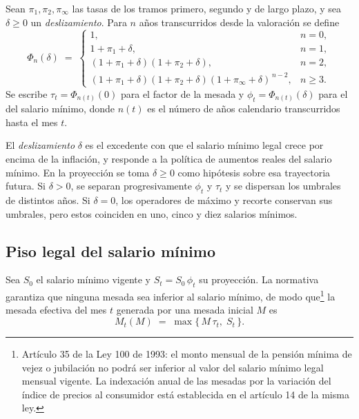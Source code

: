 \begin{definition}
\label{def:factor-indexacion}
Sean $\pi_1,\pi_2,\pi_\infty$ las tasas de los tramos primero, segundo y de largo
plazo, y sea $\delta\ge0$ un \emph{deslizamiento}. Para $n$ años transcurridos
desde la valoración se define
\begin{equation}
\label{eq:factor-ipc}
  \Phi_n(\delta)\;=\;
  \begin{cases}
    1, & n=0,\\[2pt]
    1+\pi_1+\delta, & n=1,\\[2pt]
    (1+\pi_1+\delta)(1+\pi_2+\delta), & n=2,\\[2pt]
    (1+\pi_1+\delta)(1+\pi_2+\delta)(1+\pi_\infty+\delta)^{\,n-2}, & n\ge3.
  \end{cases}
\end{equation}
Se escribe $\tau_t=\Phi_{n(t)}(0)$ para el factor de la mesada y
$\phi_t=\Phi_{n(t)}(\delta)$ para el del salario mínimo, donde $n(t)$ es el número
de años calendario transcurridos hasta el mes $t$.
\end{definition}

El \emph{deslizamiento} $\delta$ es el excedente con que el salario mínimo legal
crece por encima de la inflación, y responde a la política de aumentos reales del
salario mínimo. En la proyección se toma $\delta\ge0$ como hipótesis sobre esa
trayectoria futura. Si $\delta>0$, se separan progresivamente $\phi_t$ y
$\tau_t$ y se dispersan los umbrales de distintos años. Si $\delta=0$,
los operadores de máximo y recorte conservan sus umbrales, pero estos
coinciden en uno, cinco y diez salarios mínimos.

\subsection{Piso legal del salario mínimo}

Sea $S_0$ el salario mínimo vigente y $S_t=S_0\,\phi_t$ su proyección. La
normativa garantiza que ninguna mesada sea inferior al salario mínimo, de modo que\footnote{Artículo 35 de la Ley 100 de 1993: el monto mensual de la pensión mínima de vejez o jubilación no podrá ser inferior al valor del salario mínimo legal mensual vigente. La indexación anual de las mesadas por la variación del índice de precios al consumidor está establecida en el artículo 14 de la misma ley.}
la mesada efectiva del mes $t$ generada por una mesada inicial $M$ es
\begin{equation}
\label{eq:mesada-piso}
  M_t(M) \;=\; \max\bigl\{\,M\,\tau_t,\;S_t\,\bigr\}.
\end{equation}

